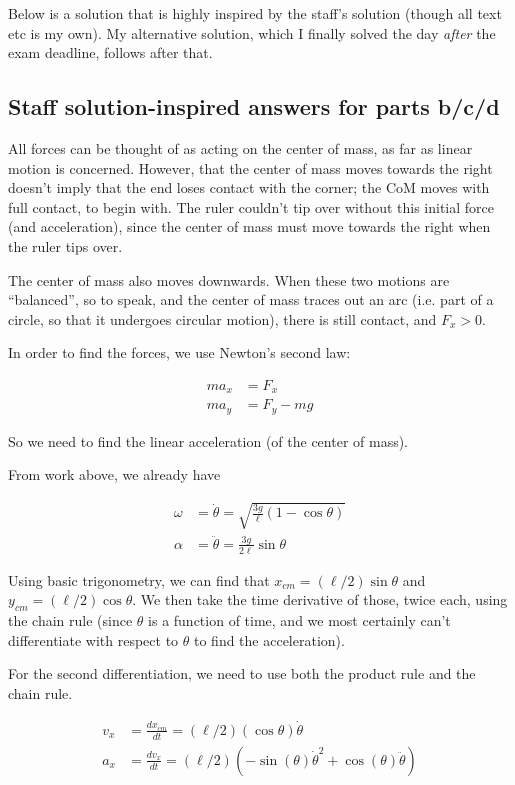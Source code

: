 \documentclass[8.01x]{subfiles}
\begin{document}
Below is a solution that is highly inspired by the staff's solution (though all text etc is my own). My alternative solution, which I finally solved the day \emph{after} the exam deadline, follows after that.

\subsection{Staff solution-inspired answers for parts b/c/d}

All forces can be thought of as acting on the center of mass, as far as linear motion is concerned. However, that the center of mass moves towards the right doesn't imply that the end loses contact with the corner; the CoM moves with full contact, to begin with. The ruler couldn't tip over without this initial force (and acceleration), since the center of mass must move towards the right when the ruler tips over.

The center of mass also moves downwards. When these two motions are ``balanced'', so to speak, and the center of mass traces out an arc (i.e. part of a circle, so that it undergoes circular motion), there is still contact, and $F_x > 0$.

In order to find the forces, we use Newton's second law:

\begin{align}
m a_x &= F_x\\
m a_y &= F_y - m g
\end{align}

So we need to find the linear acceleration (of the center of mass).

From work above, we already have

\begin{align}
\omega &= \dot{\theta} = \sqrt{\frac{3g}{\ell} (1 - \cos \theta)}\\
\alpha &= \ddot{\theta} = \frac{3 g}{2 \ell} \sin \theta
\end{align}

Using basic trigonometry, we can find that $x_{cm} = (\ell/2) \sin \theta$ and $y_{cm} = (\ell/2) \cos \theta$. We then take the time derivative of those, twice each, using the chain rule (since $\theta$ is a function of time, and we most certainly can't differentiate with respect to $\theta$ to find the acceleration).

For the second differentiation, we need to use both the product rule and the chain rule.

\begin{align}
v_x &= \frac{d x_{cm}}{dt} = (\ell/2) (\cos \theta) \dot{\theta}\\
a_x &= \frac{d v_x}{dt}    = (\ell/2) (-\sin (\theta) \dot {\theta}^2 + \cos (\theta) \ddot{\theta})
\end{align}
\end{document}
